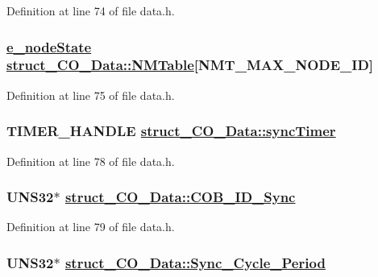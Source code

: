 Definition at line 74 of file data.h.\hypertarget{structstruct__CO__Data_40414cf320a3c3d6236790bd10b4301a}{
\subsubsection[NMTable]{\setlength{\rightskip}{0pt plus 5cm}\hyperlink{states_8h_5891f63a4c9243179838389a93d084e2}{e\_\-node\-State} \hyperlink{structstruct__CO__Data_40414cf320a3c3d6236790bd10b4301a}{struct\_\-CO\_\-Data::NMTable}\mbox{[}NMT\_\-MAX\_\-NODE\_\-ID\mbox{]}}}
\label{structstruct__CO__Data_40414cf320a3c3d6236790bd10b4301a}




Definition at line 75 of file data.h.\hypertarget{structstruct__CO__Data_b8e7a429eb6e0bca2429685725516fe8}{
\subsubsection[syncTimer]{\setlength{\rightskip}{0pt plus 5cm}TIMER\_\-HANDLE \hyperlink{structstruct__CO__Data_b8e7a429eb6e0bca2429685725516fe8}{struct\_\-CO\_\-Data::sync\-Timer}}}
\label{structstruct__CO__Data_b8e7a429eb6e0bca2429685725516fe8}




Definition at line 78 of file data.h.\hypertarget{structstruct__CO__Data_eb1479220ec68407a35635bfbffa3386}{
\subsubsection[COB\_\-ID\_\-Sync]{\setlength{\rightskip}{0pt plus 5cm}UNS32$\ast$ \hyperlink{structstruct__CO__Data_eb1479220ec68407a35635bfbffa3386}{struct\_\-CO\_\-Data::COB\_\-ID\_\-Sync}}}
\label{structstruct__CO__Data_eb1479220ec68407a35635bfbffa3386}




Definition at line 79 of file data.h.\hypertarget{structstruct__CO__Data_2dddbef6ce165dca7ff916e2e1409142}{
\subsubsection[Sync\_\-Cycle\_\-Period]{\setlength{\rightskip}{0pt plus 5cm}UNS32$\ast$ \hyperlink{structstruct__CO__Data_2dddbef6ce165dca7ff916e2e1409142}{struct\_\-CO\_\-Data::Sync\_\-Cycle\_\-Period}}}
\label{structstruct__CO__Data_2dddbef6ce165dca7ff916e2e1409142}




